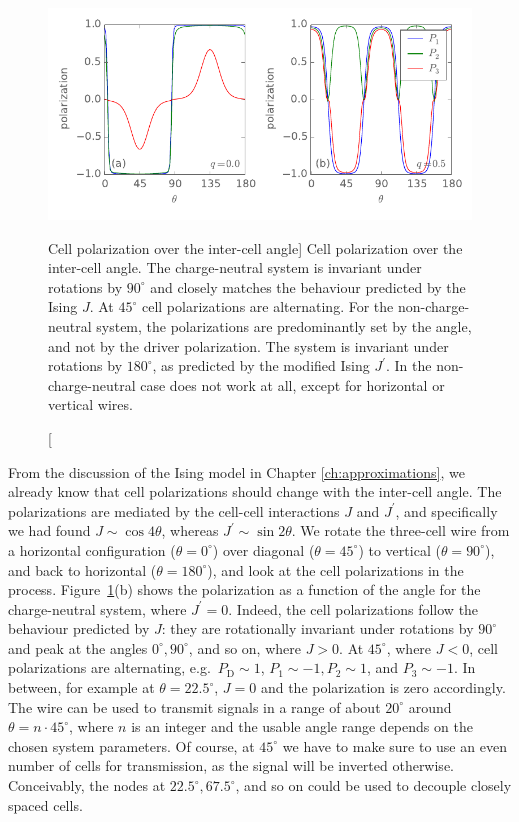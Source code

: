 \begin{figure}
  \center
  \includegraphics{three_cells_P_over_theta}
  \caption
  [Cell polarization over the inter-cell angle]
  {
  \label{fig:three_cells_P_over_theta}
  Cell polarization over the inter-cell angle. The charge-neutral system is
  invariant under rotations by $90^{\circ}$ and closely matches the behaviour
  predicted by the Ising $J$. At $45^{\circ}$ cell polarizations are
  alternating. For the non-charge-neutral system, the polarizations are
  predominantly set by the angle, and not by the driver polarization. The system
  is invariant under rotations by $180^{\circ}$, as predicted by the modified
  Ising $J^{\prime}$. In the non-charge-neutral case  does not work at
  all, except for horizontal or vertical wires.
  }
\end{figure}

From the discussion of the Ising model in Chapter \ref{ch:approximations}, we
already know that cell polarizations should change with the inter-cell angle.
The polarizations are mediated by the cell-cell interactions $J$ and
$J^{\prime}$, and specifically we had found $J \sim \cos{4 \theta}$, whereas
$J^{\prime} \sim \sin{2 \theta}$. We rotate the three-cell wire from a
horizontal configuration ($\theta = 0^{\circ}$) over diagonal ($\theta =
45^{\circ}$) to vertical ($\theta = 90^{\circ}$), and back to horizontal
($\theta = 180^{\circ}$), and look at the cell polarizations in the process.
Figure~\ref{fig:three_cells_P_over_theta}(b) shows the polarization as a function
of the angle for the charge-neutral system, where $J^{\prime} = 0$. Indeed, the
cell polarizations follow the behaviour predicted by $J$: they are rotationally
invariant under rotations by $90^{\circ}$ and peak at the angles $0^{\circ},
90^{\circ}$, and so on, where $J > 0$. At $45^{\circ}$, where $J < 0$, cell
polarizations are alternating, e.g.~$P_\text{D} \sim 1$, $P_1 \sim -1, P_2 \sim 1$, and
$P_3 \sim -1$. In between, for example at $\theta = 22.5^{\circ}$, $J = 0$ and
the polarization is zero accordingly. The wire can be used to transmit signals
in a range of about $20^{\circ}$ around $\theta = n \cdot 45^{\circ}$, where $n$
is an integer and the usable angle range depends on the chosen system
parameters. Of course, at $45^{\circ}$ we have to make sure to use an even
number of cells for transmission, as the signal will be inverted otherwise.
Conceivably, the nodes at $22.5^{\circ}, 67.5^{\circ}$, and so on could be used
to decouple closely spaced cells.


